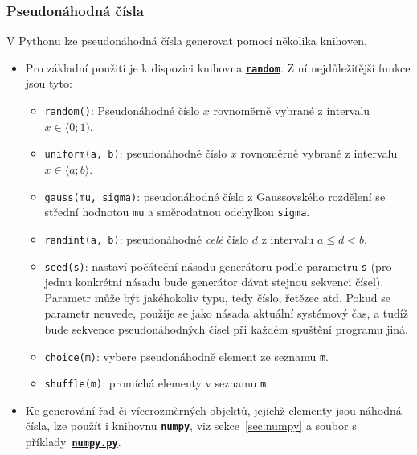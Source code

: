 \documentclass[a4paper,11pt,twoside]{article}
\def\code#1{\textnormal{\texttt{#1}}}
\def\file#1{\textnormal{\textbf{\texttt{#1}}}}
\def\ghfile#1#2{\textnormal{\textbf{\texttt{\href{https://github.com/PavelStransky/PCInPhysics/blob/main/#1#2}{#2}}}}}
\theoremstyle{red}
\theoremstyle{green}
\begin{document}
\subsubsection{Pseudonáhodná čísla}\label{sec:PseudonahodnaCisla}
    V Pythonu lze pseudonáhodná čísla generovat pomocí několika knihoven.
    \begin{itemize}
        \item 
            Pro základní použití je k dispozici knihovna \file{\href{https://docs.python.org/3/library/random.html}{random}}.
            Z ní nejdůležitější funkce jsou tyto:
            \begin{itemize}
                \item \code{random()}: Pseudonáhodné číslo $x$ rovnoměrně vybrané z intervalu $x\in\langle 0;1)$.
                \item \code{uniform(a, b)}: pseudonáhodné číslo $x$ rovnoměrně vybrané z intervalu $x\in\langle a;b\rangle$.
                \item \code{gauss(mu, sigma)}: pseudonáhodné číslo z Gaussovského rozdělení se střední hodnotou \code{mu} a směrodatnou odchylkou \code{sigma}. 
                \item \code{randint(a, b)}: pseudonáhodné \emph{celé} číslo $d$ z intervalu $a\leq d<b$.
                \item \code{seed(s)}: nastaví počáteční násadu generátoru podle parametru \code{s} (pro jednu konkrétní násadu bude generátor dávat stejnou sekvenci čísel). 
                Parametr může být jakéhokoliv typu, tedy číslo, řetězec atd. 
                Pokud se parametr neuvede, použije se jako násada aktuální systémový čas, a tudíž bude sekvence pseudonáhodných čísel při každém spuštění programu jiná.
                \item \code{choice(m)}: vybere pseudonáhodně element ze seznamu \code{m}.
                \item \code{shuffle(m)}: promíchá elementy v seznamu \code{m}.
            \end{itemize}

        \item
            Ke generování řad či vícerozměrných objektů, jejichž elementy jsou náhodná čísla, lze použít i knihovnu \file{numpy}, viz sekce~\ref{sec:numpy} a soubor s příklady~\ghfile{python/basics/}{numpy.py}.


\end{itemize}
\end{document}
